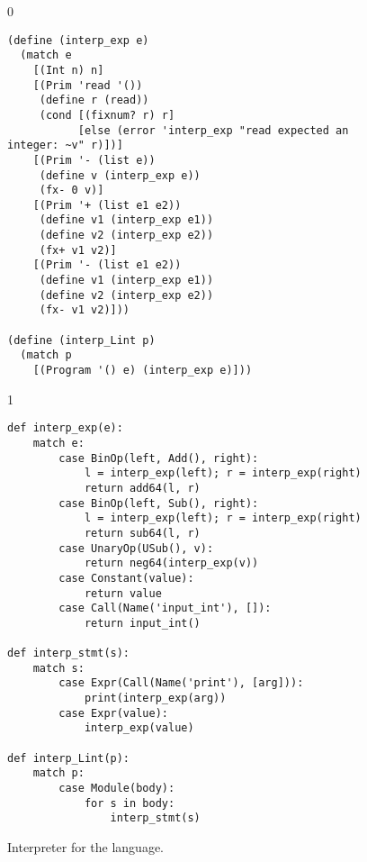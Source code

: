 \documentclass[7x10]{TimesAPriori_MIT}%
\def\racketEd{0}
\def\pythonEd{1}
\def\edition{1}
\newcommand{\pythonColor}[0]{}
\numberwithin{theorem}{chapter}
\numberwithin{definition}{chapter}
\numberwithin{equation}{chapter}
\begin{document}
\begin{figure}[tp]
\begin{tcolorbox}[colback=white]
{\if\edition\racketEd
\begin{lstlisting}
(define (interp_exp e)
  (match e
    [(Int n) n]
    [(Prim 'read '())
     (define r (read))
     (cond [(fixnum? r) r]
           [else (error 'interp_exp "read expected an integer: ~v" r)])]
    [(Prim '- (list e))
     (define v (interp_exp e))
     (fx- 0 v)]
    [(Prim '+ (list e1 e2))
     (define v1 (interp_exp e1))
     (define v2 (interp_exp e2))
     (fx+ v1 v2)]
    [(Prim '- (list e1 e2))
     (define v1 (interp_exp e1))
     (define v2 (interp_exp e2))
     (fx- v1 v2)]))

(define (interp_Lint p)
  (match p
    [(Program '() e) (interp_exp e)]))
\end{lstlisting}
\fi}
{\if\edition\pythonEd\pythonColor
\begin{lstlisting}
def interp_exp(e):
    match e:
        case BinOp(left, Add(), right):
            l = interp_exp(left); r = interp_exp(right)
            return add64(l, r)
        case BinOp(left, Sub(), right):
            l = interp_exp(left); r = interp_exp(right)
            return sub64(l, r)
        case UnaryOp(USub(), v):
            return neg64(interp_exp(v))
        case Constant(value):
            return value
        case Call(Name('input_int'), []):
            return input_int()

def interp_stmt(s):
    match s:
        case Expr(Call(Name('print'), [arg])):
            print(interp_exp(arg))
        case Expr(value):
            interp_exp(value)

def interp_Lint(p):
    match p:
        case Module(body):
            for s in body:
                interp_stmt(s)
\end{lstlisting}
\fi}
\end{tcolorbox}

\caption{Interpreter for the \LangInt{} language.}
\label{fig:interp_Lint}
\end{figure}
\end{document}
